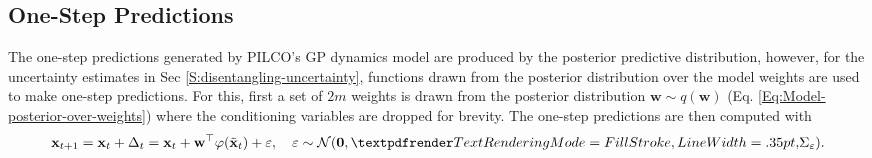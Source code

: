 \subsection{One-Step Predictions}
\label{S:one-step-predictions}
The one-step predictions generated by PILCO's GP dynamics model are produced by the posterior predictive distribution, however, for the uncertainty estimates in Sec \ref{S:disentangling-uncertainty}, functions drawn from the posterior distribution over the model weights are used to make one-step predictions. For this, first a set of $2m$ weights is drawn from the posterior distribution $\mathbf{w} \sim q(\mathbf{w})$ (Eq. \ref{Eq:Model-posterior-over-weights}) where the conditioning variables are dropped for brevity. The one-step predictions are then computed with
\begin{equation}
    \mathbf{x}_{t+1}
    = \mathbf{x}_{t} + \Delta_{t} \\
    =\mathbf{x}_{t}+\mathbf{w}^{\top}\varphi(\tilde{\mathbf{x}}_{t}) + \varepsilon,\quad\varepsilon\sim\mathcal{N}(\mathbf{0},\boldgreek{\Sigma}_{\varepsilon} ).
    \label{Eq:model-posterior-one-step}
\end{equation}

